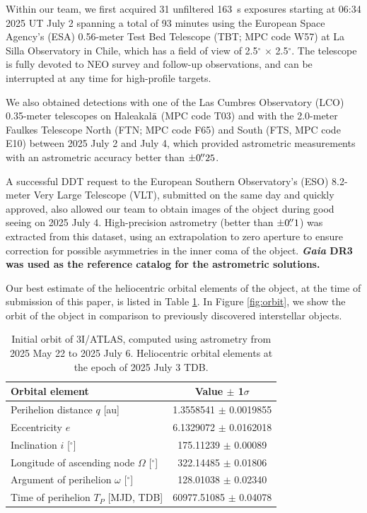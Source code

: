 \documentclass[linenumbers,twocolumn,longbib]{aastex7}
\begin{document}
Within our team, we first acquired 31 unfiltered 163~s exposures starting at 06:34 2025 UT July 2 spanning a total of 93 minutes using the European Space Agency's (ESA) 0.56-meter Test Bed Telescope (TBT; MPC code W57) at La Silla Observatory in Chile, which has a field of view of 2.5$^{\circ}$ $\times$ 2.5$^{\circ}$. The telescope is fully devoted to NEO survey and follow-up observations, and can be interrupted at any time for high-profile targets.

We also obtained detections with one of the Las Cumbres Observatory (LCO) 0.35-meter telescopes on Haleakal${\rm\bar{a}}$ (MPC code T03) and with the 2.0-meter Faulkes Telescope North (FTN; MPC code F65) and South (FTS, MPC code E10) between 2025 July 2 and July 4, which provided astrometric measurements with an astrometric accuracy better than $\pm0\mbox{$.\!\!^{\prime\prime}$}25$.

A successful DDT request to the European Southern Observatory's (ESO) 8.2-meter Very Large Telescope (VLT), submitted on the same day and quickly approved, also allowed our team to obtain images of the object during good seeing on 2025 July 4. High-precision astrometry (better than $\pm0\mbox{$.\!\!^{\prime\prime}$}1$) was extracted from this dataset, using an extrapolation to zero aperture to ensure correction for possible asymmetries in the inner coma of the object. \textbf{\textit{Gaia} DR3 \citep{gaiacollaboration2023_gaiadr3} was used as the reference catalog for the astrometric solutions.}

Our best estimate of the heliocentric orbital elements of the object, at the time of submission of this paper, is listed in Table \ref{table:orbit}. In Figure \ref{fig:orbit}, we show the orbit of the object in comparison to previously discovered interstellar objects.

\begin{table}
\centering
\caption{Initial orbit of 3I/ATLAS, computed using astrometry from 2025 May 22 to 2025 July 6. Heliocentric orbital elements at the epoch of 2025 July 3 TDB.}
\begin{tabular}{lc}
\hline
Orbital element & Value $\pm$ 1$\sigma$ \\
\hline
Perihelion distance $q$ [au]                    &   1.3558541 $\pm$ 0.0019855 \\
Eccentricity $e$                                &   6.1329072 $\pm$ 0.0162018 \\
Inclination $i$ [$^\circ$]                      & 175.11239   $\pm$ 0.00089  \\
Longitude of ascending node $\Omega$ [$^\circ$] & 322.14485   $\pm$ 0.01806  \\
Argument of perihelion $\omega$ [$^\circ$]      & 128.01038   $\pm$ 0.02340  \\
Time of perihelion $T_P$ [MJD, TDB]             & 60977.51085 $\pm$ 0.04078  \\
\hline
\end{tabular}
\label{table:orbit}
\end{table}
\end{document}
